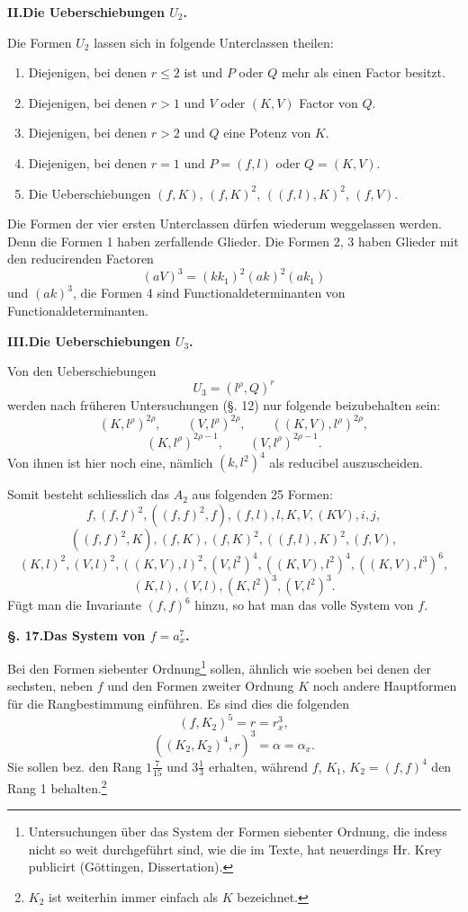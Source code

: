 \documentclass[10pt]{article}
\begin{document}
\begin{center}
{\bfseries II.\quad Die Ueberschiebungen $U_2$.}
\end{center}

Die Formen $U_2$ lassen sich in folgende Unterclassen theilen:
\begin{enumerate}
\item Diejenigen, bei denen $r\leq 2$ ist und $P$ oder $Q$ mehr als einen Factor besitzt.
\item Diejenigen, bei denen $r>1$ und $V$ oder $(K,V)$ Factor von $Q$.
\item Diejenigen, bei denen $r>2$ und $Q$ eine Potenz von $K$.
\item Diejenigen, bei denen $r=1$ und $P=(f,l)$ oder $Q=(K,V)$.
\item Die Ueberschiebungen $(f,K)$, $(f,K)^2$, $((f,l),K)^2$, $(f,V)$.
\end{enumerate}
Die Formen der vier ersten Unterclassen dürfen wiederum weggelassen werden. Denn die Formen 1 haben zerfallende Glieder. Die Formen 2, 3 haben Glieder mit den reducirenden Factoren
\[
(aV)^3=(kk_1)^2(ak)^2(ak_1)
\]
und $(ak)^3$, die Formen 4 sind Functionaldeterminanten von Functionaldeterminanten.

\begin{center}
{\bfseries III.\quad Die Ueberschiebungen $U_3$.}
\end{center}

Von den Ueberschiebungen
\[
U_3=(l^\rho,Q)^r
\]
werden nach früheren Untersuchungen (§. 12) nur folgende beizubehalten sein:
\[
(K,l^\rho)^{2\rho},
\qquad (V,l^\rho)^{2\rho},
\qquad ((K,V),l^\rho)^{2\rho},
\]
\[
(K,l^\rho)^{2\rho-1},
\qquad (V,l^\rho)^{2\rho-1}.
\]
Von ihnen ist hier noch eine, nämlich $(k,l^2)^4$ als reducibel auszuscheiden.

Somit besteht schliesslich das $A_2$ aus folgenden 25 Formen:
\[
f,(f,f)^2,((f,f)^2,f),(f,l),l,K,V,(KV),i,j,
\]
\[
((f,f)^2,K),(f,K),(f,K)^2,((f,l),K)^2,(f,V),
\]
\[
(K,l)^2,(V,l)^2,((K,V),l)^2,(V,l^2)^4,((K,V),l^2)^4,((K,V),l^3)^6,
\]
\[
(K,l),(V,l),(K,l^2)^3,(V,l^2)^3.
\]
Fügt man die Invariante $(f,f)^6$ hinzu, so hat man das volle System von $f$.

\begin{center}
{\bfseries §. 17.\quad Das System von $f=a_x^7$.}
\end{center}

Bei den Formen siebenter Ordnung\footnote{Untersuchungen über das System der Formen siebenter Ordnung, die indess nicht so weit durchgeführt sind, wie die im Texte, hat neuerdings Hr. Krey publicirt (Göttingen, Dissertation).} sollen, ähnlich wie soeben bei denen der sechsten, neben $f$ und den Formen zweiter Ordnung $K$ noch andere Hauptformen für die Rangbestimmung einführen. Es sind dies die folgenden
\[
(f,K_2)^5=r=r_x^3,
\]
\[
((K_2,K_2)^4,r)^3=\alpha=\alpha_x.
\]
Sie sollen bez. den Rang $1\frac7{15}$ und $3\frac13$ erhalten, während $f$, $K_1$, $K_2=(f,f)^4$ den Rang 1 behalten.\footnote{$K_2$ ist weiterhin immer einfach als $K$ bezeichnet.}
\end{document}
